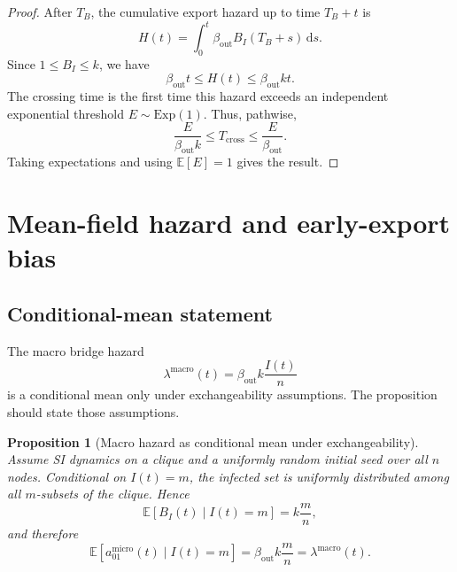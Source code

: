 \documentclass[12pt,a4paper]{article}
\newtheorem{proposition}{Proposition}
\theoremstyle{definition}
\newcommand{\E}{\mathbb{E}}
\newcommand{\1}{\mathbf{1}}
\newcommand{\Exp}{\mathrm{Exp}}
\newcommand{\dint}{\,\mathrm{d}}
\begin{document}
\begin{proof}
After $T_B$, the cumulative export hazard up to time $T_B+t$ is
\begin{equation}
    H(t)=\int_0^t \beta_{\mathrm{out}}B_I(T_B+s)\dint s.
\end{equation}
Since $1\le B_I\le k$, we have
\begin{equation}
    \beta_{\mathrm{out}}t\le H(t)\le \beta_{\mathrm{out}}kt.
\end{equation}
The crossing time is the first time this hazard exceeds an independent exponential threshold $E\sim\Exp(1)$.  Thus, pathwise,
\begin{equation}
    \frac{E}{\beta_{\mathrm{out}}k}\le T_{\mathrm{cross}}\le \frac{E}{\beta_{\mathrm{out}}}.
\end{equation}
Taking expectations and using $\E[E]=1$ gives the result.
\end{proof}

\section{Mean-field hazard and early-export bias}

\subsection{Conditional-mean statement}

The macro bridge hazard
\begin{equation}
    \lambda^{\mathrm{macro}}(t)=\beta_{\mathrm{out}}k\frac{I(t)}{n}
\end{equation}
is a conditional mean only under exchangeability assumptions.  The proposition should state those assumptions.

\begin{proposition}[Macro hazard as conditional mean under exchangeability]
Assume SI dynamics on a clique and a uniformly random initial seed over all $n$ nodes.  Conditional on $I(t)=m$, the infected set is uniformly distributed among all $m$-subsets of the clique.  Hence
\begin{equation}
    \E[B_I(t)\mid I(t)=m]=k\frac{m}{n},
\end{equation}
and therefore
\begin{equation}
    \E[a_{01}^{\mathrm{micro}}(t)\mid I(t)=m]
    =\beta_{\mathrm{out}}k\frac{m}{n}
    =\lambda^{\mathrm{macro}}(t).
\end{equation}
\end{proposition}
\end{document}
